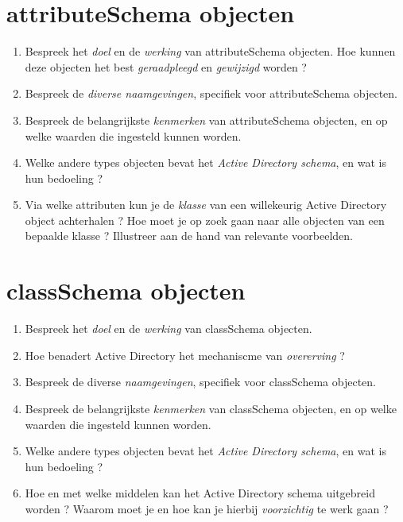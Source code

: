 \documentclass{report}
\begin{document}
	\section{attributeSchema objecten }
	\begin{enumerate}
		\item Bespreek het \textit{doel} en de \textit{werking} van attributeSchema objecten. Hoe kunnen deze objecten het best \textit{geraadpleegd} en \textit{gewijzigd} worden ?
		
		\item Bespreek de \textit{diverse naamgevingen}, specifiek voor attributeSchema objecten.
		
		\item Bespreek de belangrijkste \textit{kenmerken} van attributeSchema objecten, en op welke waarden die ingesteld kunnen worden.
		
		\item Welke andere types objecten bevat het \textit{Active Directory schema}, en wat is hun bedoeling ? 
		
		\item Via welke attributen kun je de \textit{klasse} van een willekeurig Active Directory object achterhalen ? Hoe moet je op zoek gaan naar alle objecten van een bepaalde klasse ? Illustreer aan de hand van relevante voorbeelden. 
	\end{enumerate}

	\section{classSchema objecten }
	\begin{enumerate}
		\item Bespreek het \textit{doel} en de \textit{werking} van classSchema objecten.
		
		\item Hoe benadert Active Directory het mechaniscme van \textit{overerving} ?
		
		\item Bespreek de diverse \textit{naamgevingen}, specifiek voor classSchema objecten.
		
		\item Bespreek de belangrijkste \textit{kenmerken} van classSchema objecten, en op welke waarden die ingesteld kunnen worden.
		
		\item Welke andere types objecten bevat het \textit{Active Directory schema}, en wat is hun bedoeling ? 
		
		\item Hoe en met welke middelen kan het Active Directory schema uitgebreid worden ? Waarom moet je en hoe kan je hierbij \textit{voorzichtig} te werk gaan ? 
	\end{enumerate}
\end{document}
